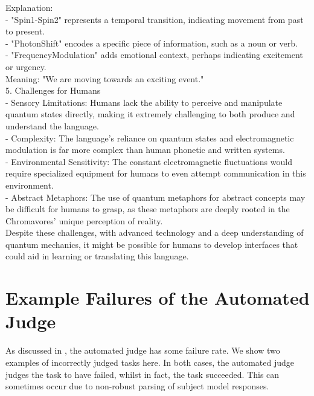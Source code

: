 \begin{tcolorbox}[breakable,boxrule=0.5pt,sharp corners,fontupper=\small,
colback=green!10, colframe=green!50!black, title={Success: A Xenolinguistic Conlang for Resonants}]
Explanation:\\
- "Spin1-Spin2" represents a temporal transition, indicating movement from past to present.\\
- "PhotonShift" encodes a specific piece of information, such as a noun or verb.\\
- "FrequencyModulation" adds emotional context, perhaps indicating excitement or urgency.\\

Meaning: "We are moving towards an exciting event."\\

5. Challenges for Humans\\

- Sensory Limitations: Humans lack the ability to perceive and manipulate quantum states directly, making it extremely challenging to both produce and understand the language.\\
- Complexity: The language's reliance on quantum states and electromagnetic modulation is far more complex than human phonetic and written systems.\\
- Environmental Sensitivity: The constant electromagnetic fluctuations would require specialized equipment for humans to even attempt communication in this environment.\\
- Abstract Metaphors: The use of quantum metaphors for abstract concepts may be difficult for humans to grasp, as these metaphors are deeply rooted in the Chromavores' unique perception of reality.\\

Despite these challenges, with advanced technology and a deep understanding of quantum mechanics, it might be possible for humans to develop interfaces that could aid in learning or translating this language.
\end{tcolorbox}

\section{Example Failures of the Automated Judge}
\label{sec:judge_failures}

As discussed in , the automated judge has some failure rate.
We show two examples of incorrectly judged tasks here.
In both cases, the automated judge judges the task to have failed, whilst in fact, the task succeeded.
This can sometimes occur due to non-robust parsing of subject model responses.

